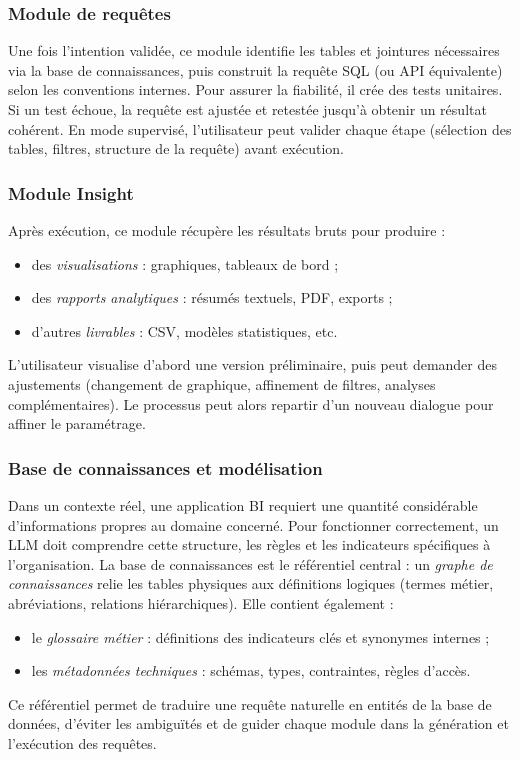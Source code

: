\documentclass[conference]{IEEEtran}
\begin{document}
\subsubsection{Module de requêtes}
Une fois l’intention validée, ce module identifie les tables et jointures nécessaires via la base de connaissances, puis construit la requête SQL (ou API équivalente) selon les conventions internes. Pour assurer la fiabilité, il crée des tests unitaires. Si un test échoue, la requête est ajustée et retestée jusqu’à obtenir un résultat cohérent. En mode supervisé, l’utilisateur peut valider chaque étape (sélection des tables, filtres, structure de la requête) avant exécution.

\subsubsection{Module Insight}
Après exécution, ce module récupère les résultats bruts pour produire :
\begin{itemize}
    \item des \emph{visualisations} : graphiques, tableaux de bord ;
    \item des \emph{rapports analytiques} : résumés textuels, PDF, exports ;
    \item d’autres \emph{livrables} : CSV, modèles statistiques, etc.
\end{itemize}
L’utilisateur visualise d’abord une version préliminaire, puis peut demander des ajustements (changement de graphique, affinement de filtres, analyses complémentaires). Le processus peut alors repartir d’un nouveau dialogue pour affiner le paramétrage.

\subsubsection{Base de connaissances et modélisation}
Dans un contexte réel, une application BI requiert une quantité considérable d’informations propres au domaine concerné. Pour fonctionner correctement, un LLM doit comprendre cette structure, les règles et les indicateurs spécifiques à l’organisation. La base de connaissances est le référentiel central : un \emph{graphe de connaissances} relie les tables physiques aux définitions logiques (termes métier, abréviations, relations hiérarchiques). Elle contient également :
\begin{itemize}
    \item le \emph{glossaire métier} : définitions des indicateurs clés et synonymes internes ;
    \item les \emph{métadonnées techniques} : schémas, types, contraintes, règles d’accès.
\end{itemize}
Ce référentiel permet de traduire une requête naturelle en entités de la base de données, d’éviter les ambiguïtés et de guider chaque module dans la génération et l’exécution des requêtes.
\end{document}
